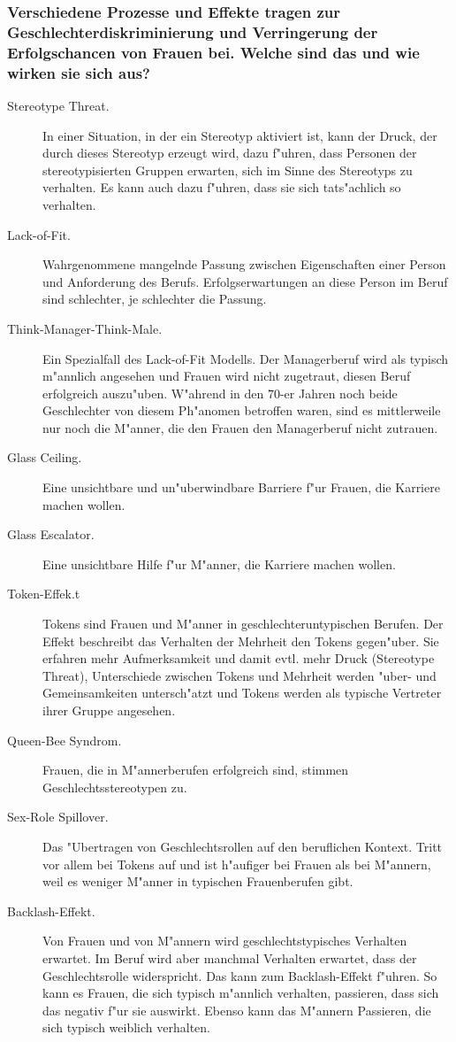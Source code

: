 \subsubsection{Verschiedene Prozesse und Effekte tragen zur Geschlechterdiskriminierung und Verringerung der Erfolgschancen von Frauen bei. Welche sind das und wie wirken sie sich aus?}
\begin{description}
        \item[Stereotype Threat.] In einer Situation, in der ein Stereotyp aktiviert ist, kann der Druck, der durch dieses Stereotyp erzeugt wird, dazu f"uhren, dass Personen der stereotypisierten Gruppen erwarten, sich im Sinne des Stereotyps zu verhalten. Es kann auch dazu f"uhren, dass sie sich tats"achlich so verhalten. 
        \item [Lack-of-Fit.] Wahrgenommene mangelnde Passung zwischen Eigenschaften einer Person und Anforderung des Berufs. Erfolgserwartungen an diese Person im Beruf sind schlechter, je schlechter die Passung. 
        \item [Think-Manager-Think-Male.] Ein Spezialfall des Lack-of-Fit Modells. Der Managerberuf wird als typisch m"annlich angesehen und Frauen wird nicht zugetraut, diesen Beruf erfolgreich auszu"uben. W"ahrend in den $70$-er Jahren noch beide Geschlechter von diesem Ph"anomen betroffen waren, sind es mittlerweile nur noch die M"anner, die den Frauen den Managerberuf nicht zutrauen.
        \item [Glass Ceiling.] Eine unsichtbare und un"uberwindbare Barriere f"ur Frauen, die Karriere machen wollen.
        \item [Glass Escalator.] Eine unsichtbare Hilfe f"ur M"anner, die Karriere machen wollen. 
        \item [Token-Effek.t] Tokens sind Frauen und M"anner in geschlechteruntypischen Berufen. Der Effekt beschreibt das Verhalten der Mehrheit den Tokens gegen"uber. Sie erfahren mehr Aufmerksamkeit und damit evtl. mehr Druck (Stereotype Threat), Unterschiede zwischen Tokens und Mehrheit werden "uber- und Gemeinsamkeiten untersch"atzt und Tokens werden als typische Vertreter ihrer Gruppe angesehen.
        \item [Queen-Bee Syndrom.] Frauen, die in M"annerberufen erfolgreich sind, stimmen Geschlechtsstereotypen zu. 
        \item [Sex-Role Spillover.] Das "Ubertragen von Geschlechtsrollen auf den beruflichen Kontext. Tritt vor allem bei Tokens auf und ist h"aufiger bei Frauen als bei M"annern, weil es weniger M"anner in typischen Frauenberufen gibt. 
        \item [Backlash-Effekt.] Von Frauen und von M"annern wird geschlechtstypisches Verhalten erwartet. Im Beruf wird aber manchmal Verhalten erwartet, dass der Geschlechtsrolle widerspricht. Das kann zum Backlash-Effekt f"uhren. So kann es Frauen, die sich typisch m"annlich verhalten, passieren, dass sich das negativ f"ur sie auswirkt. Ebenso kann das M"annern Passieren, die sich typisch weiblich verhalten.
\end{description}
